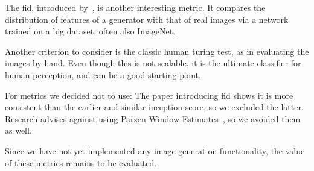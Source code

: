 The \ac{fid}, introduced by~\cite{fid}, is another interesting metric.
It compares the distribution of features of a generator with that of real images via a network trained on a big
dataset, often also ImageNet.

Another criterion to consider is the classic human turing test, as in evaluating the images by hand.
Even though this is not scalable, it is the ultimate classifier for human perception, and can be a good starting
point.

For metrics we decided not to use: The paper introducing \ac{fid} shows it is more consistent than the earlier and
similar inception score, so we excluded the latter.
Research advises against using Parzen Window Estimates~\cite{note_on_eval}, so we avoided them as well.

Since we have not yet implemented any image generation functionality, the value of these metrics remains to be evaluated.